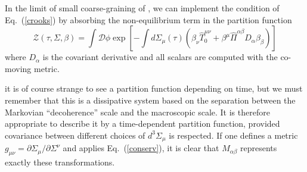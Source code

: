 \documentclass[12pt,onecolumn,showpacs,amssymb,aps,nofootinbib,floatfix]{revtex4-2}
\renewcommand{\eqref}[1]{Eq.~(\ref{#1})}
\begin{document}
        \color{black}
        In the limit of small coarse-graining of \cite{crooks}, we can implement the condition of \eqref{crooks} by absorbing the non-equilibrium term in the partition function
        \begin{equation}
\label{eomz}
          \mathcal{Z}(\tau,\Sigma,\beta)= \int \mathcal{D}\phi \exp 
\left[ -\int d \Sigma_\mu(\tau) \left(  \beta_\nu \hat{T}_0^{\mu
\nu} + \beta^\mu \hat{\Pi}^{\alpha \beta}
    D_\alpha \beta_\beta \right) \right]
        \end{equation}
        where $D_\alpha$ is the covariant derivative and all scalars are computed with the co-moving metric.
        
        it is of course strange to see a partition function depending on time, but we must remember that this is a dissipative system based on \cite{crooks} the separation between the Markovian ``decoherence'' scale and the macroscopic scale.  It is therefore appropriate to describe it by a time-dependent partition function, provided covariance between different choices of $d^3 \Sigma_\mu$ is respected.                If one defines a metric $g_{\mu \nu}=\partial \Sigma_\mu/\partial \Sigma^\nu$ and applies \eqref{conserv}, it is clear that $M_{\alpha \beta}$ represents exactly these transformations. \color{black}
\end{document}
